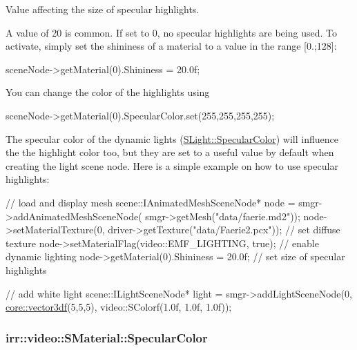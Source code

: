 Value affecting the size of specular highlights. 

A value of 20 is common. If set to 0, no specular highlights are being used. To activate, simply set the shininess of a material to a value in the range \mbox{[}0.;128\mbox{]}\+: 
\begin{DoxyCode}
sceneNode->getMaterial(0).Shininess = 20.0f;
\end{DoxyCode}


You can change the color of the highlights using 
\begin{DoxyCode}
sceneNode->getMaterial(0).SpecularColor.set(255,255,255,255);
\end{DoxyCode}


The specular color of the dynamic lights (\hyperlink{structirr_1_1video_1_1SLight_a2d66ad28850a8588b2ba727103710604}{S\+Light\+::\+Specular\+Color}) will influence the the highlight color too, but they are set to a useful value by default when creating the light scene node. Here is a simple example on how to use specular highlights\+: 
\begin{DoxyCode}
\textcolor{comment}{// load and display mesh}
scene::IAnimatedMeshSceneNode* node = smgr->addAnimatedMeshSceneNode(
smgr->getMesh(\textcolor{stringliteral}{"data/faerie.md2"}));
node->setMaterialTexture(0, driver->getTexture(\textcolor{stringliteral}{"data/Faerie2.pcx"})); \textcolor{comment}{// set diffuse texture}
node->setMaterialFlag(video::EMF\_LIGHTING, \textcolor{keyword}{true}); \textcolor{comment}{// enable dynamic lighting}
node->getMaterial(0).Shininess = 20.0f; \textcolor{comment}{// set size of specular highlights}

\textcolor{comment}{// add white light}
scene::ILightSceneNode* light = smgr->addLightSceneNode(0,
    \hyperlink{namespaceirr_1_1core_a06f169d08b5c429f5575acb7edbad811}{core::vector3df}(5,5,5), video::SColorf(1.0f, 1.0f, 1.0f));
\end{DoxyCode}
\subsubsection[{\texorpdfstring{Specular\+Color}{SpecularColor}}]{ irr\+::video\+::\+S\+Material\+::\+Specular\+Color}\hypertarget{classirr_1_1video_1_1SMaterial_a253c2acbafe6698e3d16b3e3a1e199ed}{}\label{classirr_1_1video_1_1SMaterial_a253c2acbafe6698e3d16b3e3a1e199ed}


